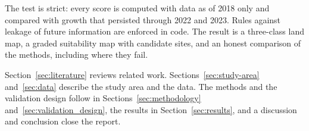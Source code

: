 The test is strict: every score is computed with data as of 2018 only and compared with growth
that persisted through 2022 and 2023. Rules against leakage of future information are enforced
in code. The result is a three-class land map, a graded suitability map with candidate sites, and
an honest comparison of the methods, including where they fail.

Section~\ref{sec:literature} reviews related work. Sections~\ref{sec:study-area}
and~\ref{sec:data} describe the study area and the data. The methods and the validation design
follow in Sections~\ref{sec:methodology} and~\ref{sec:validation_design}, the results in
Section~\ref{sec:results}, and a discussion and conclusion close the report.
